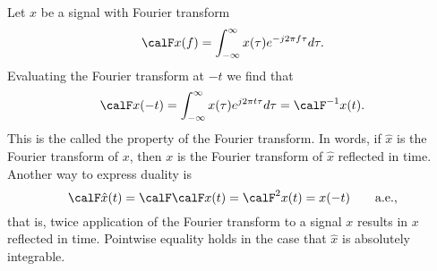 


Let $x$ be a signal with Fourier transform
\[
\calF x(f) = \int_{-\infty}^{\infty} x(\tau) e^{-j2\pi f \tau} d\tau.
\]
Evaluating the Fourier transform at $-t$ we find that
\begin{equation}\label{eq:dualityft}
\calF x(-t) = \int_{-\infty}^{\infty} x(\tau) e^{j2\pi t \tau} d\tau = \calF^{-1} x(t).
\end{equation}
This is the called the  property of the Fourier transform.  In words, if $\hat{x}$ is the Fourier transform of $x$, then $x$ is the Fourier transform of $\hat{x}$ reflected in time.  Another way to express duality is
\[
\calF \hat{x}(t) = \calF \calF x(t) = \calF^2 x(t) = x(-t) \qquad \text{a.e}.,
\]
that is, twice application of the Fourier transform to a signal $x$ results in $x$ reflected in time.  Pointwise equality holds in the case that $\hat{x}$ is absolutely integrable.

